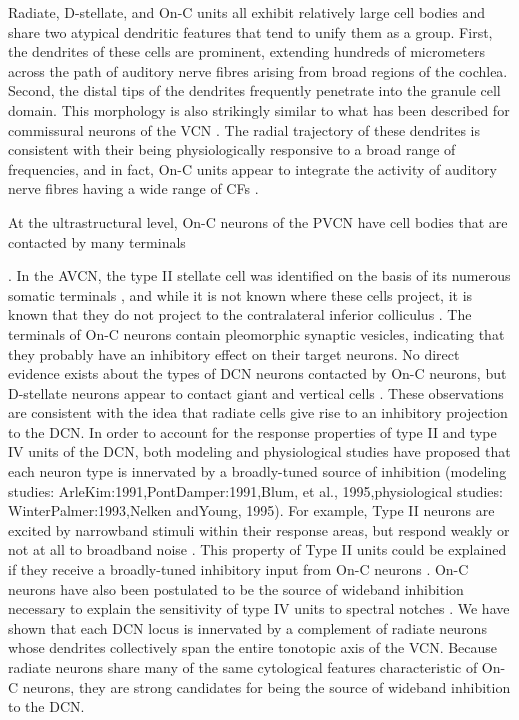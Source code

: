 \documentclass[10pt,a4paper]{article}
\begin{document}
Radiate, D-stellate, and On-C units all exhibit relatively large cell bodies and
share two atypical dendritic features that tend to unify them as a group. First,
the dendrites of these cells are prominent, extending hundreds of micrometers
across the path of auditory nerve fibres arising from broad regions of the
cochlea. Second, the distal tips of the dendrites frequently penetrate into the
granule cell domain. This morphology is also strikingly similar to what has been
described for commissural neurons of the VCN \citep{SchofieldCant:1996}. The
radial trajectory of these dendrites is consistent with their being
physiologically responsive to a broad range of frequencies, and in fact, On-C
units appear to integrate the activity of auditory nerve fibres having a wide
range of CFs
\citep{RhodeSmith:1986,WinterPalmer:1995,JiangPalmerEtAl:1996,PalmerWallaceEtAl:1996}.

At the ultrastructural level, On-C neurons of the PVCN have cell bodies that are
contacted by many terminals

\citep{SmithRhode:1989}. In the AVCN, the type II stellate cell was identified
on the basis of its numerous somatic terminals \citep{Cant:1981}, and while it
is not known where these cells project, it is known that they do not project to
the contralateral inferior colliculus \citep{Cant:1982}. The terminals of On-C
neurons contain pleomorphic synaptic vesicles, indicating that they probably
have an inhibitory effect on their target neurons. No direct evidence exists
about the types of DCN neurons contacted by On-C neurons, but D-stellate neurons
appear to contact giant and vertical cells \citep{ZhangOertel:1993a,b}. These
observations are consistent with the idea that radiate cells give rise to an
inhibitory projection to the DCN. In order to account for the response
properties of type II and type IV units of the DCN, both modeling and
physiological studies have proposed that each neuron type is innervated by a
broadly-tuned source of inhibition (modeling studies:
ArleKim:1991,PontDamper:1991,Blum, et al., 1995,physiological studies:
WinterPalmer:1993,Nelken andYoung, 1995).  For example, Type II neurons are
excited by narrowband stimuli within their response areas, but respond weakly or
not at all to broadband noise \citep{YoungBrownell:1976}. This property of Type
II units could be explained if they receive a broadly-tuned inhibitory input
from On-C neurons \citep{WinterPalmer:1993}. On-C neurons have also been
postulated to be the source of wideband inhibition necessary to explain the
sensitivity of type IV units to spectral notches \citep{NelkenYoung:1995}. We
have shown that each DCN locus is innervated by a complement of radiate neurons
whose dendrites collectively span the entire tonotopic axis of the VCN. Because
radiate neurons share many of the same cytological features characteristic of
On-C neurons, they are strong candidates for being the source of wideband
inhibition to the DCN.
\end{document}
